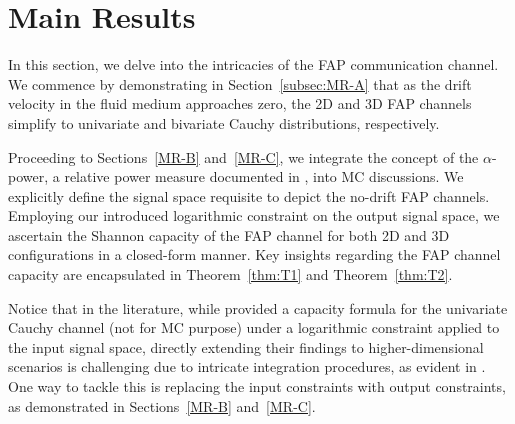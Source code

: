 \documentclass[conference]{IEEEtran}
\theoremstyle{definition}
\theoremstyle{plain}
\begin{document}
\color{black}

\color{black}
\section{Main Results}\label{sec:MR}
In this section, we delve into the intricacies of the FAP communication channel. We commence by demonstrating in Section~\ref{subsec:MR-A} that as the drift velocity in the fluid medium approaches zero, the 2D and 3D FAP channels simplify to univariate and bivariate Cauchy distributions, respectively.

Proceeding to Sections~\ref{MR-B} and~\ref{MR-C}, we integrate the concept of the \(\alpha\)-power, a relative power measure documented in \cite{fahs2017information}, into MC discussions. We explicitly define the signal space requisite to depict the no-drift FAP channels. Employing our introduced logarithmic constraint on the output signal space, we ascertain the Shannon capacity of the FAP channel for both 2D and 3D configurations in a closed-form manner. Key insights regarding the FAP channel capacity are encapsulated in Theorem~\ref{thm:T1} and Theorem~\ref{thm:T2}. 

Notice that in the literature, while \cite{fahs2014cauchy} provided a capacity formula for the univariate Cauchy channel (not for MC purpose) under a logarithmic constraint applied to the input signal space, directly extending their findings to higher-dimensional scenarios is challenging due to intricate integration procedures, as evident in \cite[Appendix~I]{fahs2014cauchy}. One way to tackle this is replacing the input constraints with output constraints, as demonstrated in Sections~\ref{MR-B} and~\ref{MR-C}.
\color{black}
\end{document}
